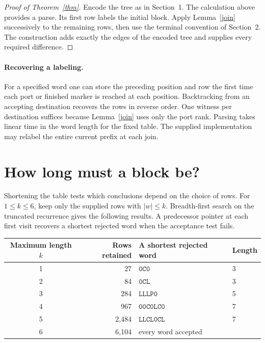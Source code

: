 \documentclass[11pt,a4paper]{article}
\newcommand{\word}[1]{\mathtt{#1}}
\begin{document}
\begin{proof}[Proof of Theorem~\ref{thm}]
Encode the tree as in Section~1. The calculation above provides a parse. Its first row labels the initial block. Apply Lemma~\ref{join} successively to the remaining rows, then use the terminal convention of Section~2. The construction adds exactly the edges of the encoded tree and supplies every required difference.
\end{proof}

\paragraph{Recovering a labeling.} For a specified word one can store the preceding position and row the first time each port or finished marker is reached at each position. Backtracking from an accepting destination recovers the rows in reverse order. One witness per destination suffices because Lemma~\ref{join} uses only the port rank. Parsing takes linear time in the word length for the fixed table. The supplied implementation may relabel the entire current prefix at each join.

\newpage
\section{How long must a block be?}
Shortening the table tests which conclusions depend on the choice of rows. For $1\le k\le6$, keep only the supplied rows with $|w|\le k$. Breadth-first search on the truncated recurrence gives the following results. A predecessor pointer at each first visit recovers a shortest rejected word when the acceptance test fails.
\begin{center}
\begin{tabular}{crll}
\hline
Maximum length $k$ & Rows retained & A shortest rejected word & Length\\\hline
1 & 27 & $\word{0C0}$ & 3\\
2 & 84 & $\word{0CL}$ & 3\\
3 & 284 & $\word{LLLP0}$ & 5\\
4 & 967 & $\word{00C0LC0}$ & 7\\
5 & 2,484 & $\word{LLCL0CL}$ & 7\\
6 & 6,104 & \multicolumn{2}{l}{every word accepted}\\\hline
\end{tabular}
\end{center}
\end{document}
